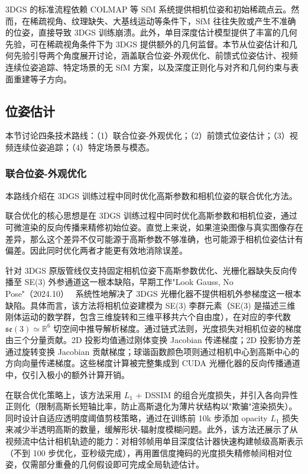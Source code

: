 3DGS 的标准流程依赖 COLMAP 等 SfM 系统提供相机位姿和初始稀疏点云。然而，在稀疏视角、纹理缺失、大基线运动等条件下，SfM 往往失败或产生不准确的位姿，直接导致 3DGS 训练崩溃。此外，单目深度估计模型提供了丰富的几何先验，可在稀疏视角条件下为 3DGS 提供额外的几何监督。本节从位姿估计和几何先验引导两个角度展开讨论，涵盖联合位姿-外观优化、前馈式位姿估计、视频连续位姿追踪、特定场景的无 SfM 方案，以及深度正则化与对齐和几何约束与表面重建等子方向。

\subsection{位姿估计}
\label{ss:12_3}

本节讨论四条技术路线：（1）联合位姿-外观优化；（2）前馈式位姿估计；（3）视频连续位姿追踪；（4）特定场景与模态。

\subsubsection{联合位姿-外观优化}

本路线介绍在 3DGS 训练过程中同时优化高斯参数和相机位姿的联合优化方法。

联合优化的核心思想是在 3DGS 训练过程中同时优化高斯参数和相机位姿，通过可微渲染的反向传播来精修初始位姿。直觉上来说，如果渲染图像与真实图像存在差异，那么这个差异不仅可能源于高斯参数不够准确，也可能源于相机位姿估计有偏差。因此同时优化两者才能更有效地消除误差。

针对 3DGS 原版管线仅支持固定相机位姿下高斯参数优化、光栅化器缺失反向传播至 SE(3) 外参通道这一根本缺陷，早期工作"Look Gauss, No Pose"（2024.10）~\cite{2410_08743} 系统性地解决了 3DGS 光栅化器不提供相机外参梯度这一根本缺陷。具体而言，该方法将相机位姿建模为 SE(3) 李群元素（SE(3) 是描述三维刚体运动的数学群，包含三维旋转和三维平移共六个自由度），在对应的李代数 $\mathfrak{se}(3) \simeq \mathbb{R}^6$ 切空间中推导解析梯度。通过链式法则，光度损失对相机位姿的梯度由三个分量贡献。2D 投影均值通过刚体变换 Jacobian 传递梯度；2D 投影协方差通过旋转变换 Jacobian 贡献梯度；球谐函数颜色项则通过相机中心到高斯中心的方向向量传递梯度。这些梯度计算被完整集成到 CUDA 光栅化器的反向传播通道中，仅引入极小的额外计算开销。

在联合优化策略上，该方法采用 $L_1$ + DSSIM 的组合光度损失，并引入各向异性正则化（限制高斯长短轴比率，防止高斯退化为薄片状结构以"欺骗"渲染损失）。同时设计自适应透明度阈值剪枝策略，通过在训练前 10k 步添加 opacity $L_1$ 损失来减少半透明高斯的数量，缓解形状-辐射度模糊问题。此外，该方法还展示了从视频流中估计相机轨迹的能力：对相邻帧用单目深度估计器快速构建帧级高斯表示（不到 100 步优化，亚秒级完成），再用置信度掩码的光度损失精修帧间相对位姿，仅需部分重叠的几何假设即可完成全局轨迹估计。

